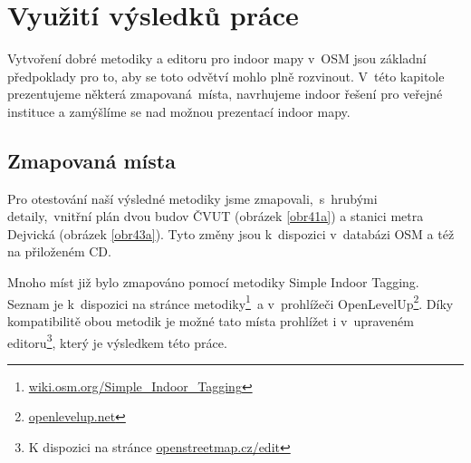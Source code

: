 \chapter{Využití výsledků práce}\label{vyuux17eituxed-vuxfdsledkux16f-pruxe1ce}

Vytvoření dobré metodiky a editoru pro indoor mapy v~OSM jsou základní předpoklady pro to, aby se toto odvětví mohlo plně rozvinout. V~této kapitole prezentujeme některá zmapovaná~místa, navrhujeme indoor řešení pro veřejné instituce a zamýšlíme se nad možnou prezentací indoor mapy.

\section{Zmapovaná místa}\label{zmapovanuxe1-muxedsta}

Pro otestování naší výsledné metodiky jsme zmapovali,~s~hrubými detaily,~vnitřní plán dvou budov ČVUT (obrázek \ref{obr41a}) a stanici metra Dejvická (obrázek \ref{obr43a}). Tyto změny jsou k~dispozici v~databázi OSM a též na přiloženém CD.

Mnoho míst již bylo zmapováno pomocí metodiky Simple Indoor Tagging. Seznam je k~dispozici na stránce metodiky\footnote{\href{http://wiki.osm.org/Simple\_Indoor\_Tagging}{wiki.osm.org/Simple\_Indoor\_Tagging}}~a v~prohlížeči OpenLevelUp\footnote{\href{http://openlevelup.net}{openlevelup.net}}. Díky kompatibilitě obou metodik je možné tato místa prohlížet i v~upraveném editoru\footnote{K dispozici na stránce \href{http://openstreetmap.cz/edit}{openstreetmap.cz/edit}}, který je výsledkem této práce.


